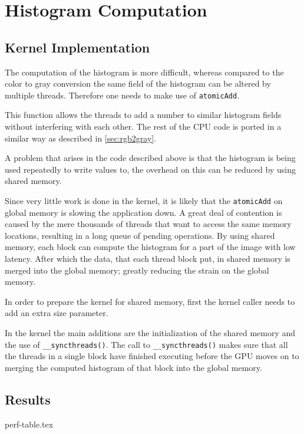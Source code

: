 \documentclass[final]{report}
\begin{document}
\chapter{Histogram Computation}

\section{Kernel Implementation}
The computation of the histogram is more difficult, whereas compared to the color to gray conversion the same field of the histogram can be altered by multiple threads.
Therefore one needs to make use of \texttt{atomicAdd\(\)}.


This function allows the threads to add a number to similar histogram fields without interfering with each other.
The rest of the CPU code is ported in a similar way as described in \cref{sec:rgb2gray}.

A problem that arises in the code described above is that the histogram is being used repeatedly to write values to, the overhead on this can be reduced by using shared memory.

Since very little work is done in the kernel, it is likely that the \texttt{atomicAdd\(\)} on global memory is slowing the application down.
A great deal of contention is caused by the mere thousands of threads that want to access the same memory locations, resulting in a long queue of pending operations.
By using shared memory, each block can compute the histogram for a part of the image with low latency.
After which the data, that each thread block put, in shared memory is merged into the global memory; greatly reducing the strain on the global memory.

In order to prepare the kernel for shared memory, first the kernel caller needs to add an extra size parameter.


In the kernel the main additions are the initialization of the shared memory and the use of \texttt{\_\_syncthreads()}.
The call to \texttt{\_\_syncthreads()} makes sure that all the threads in a single block have finished executing before the GPU moves on to merging the computed histogram of that block into the global memory.


\section{Results}
{perf-table.tex}
\end{document}
